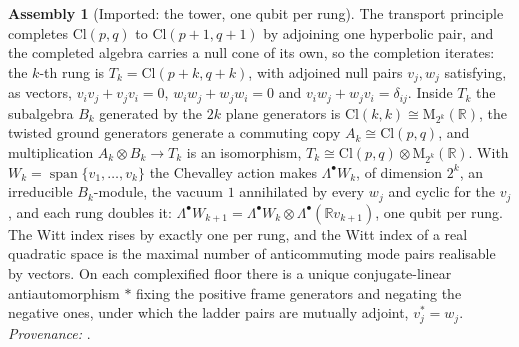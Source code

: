 \documentclass[11pt]{article}
\theoremstyle{definition}
\newtheorem{assembled}[theorem]{Assembly}
\theoremstyle{plain}
\providecommand{\Cl}{}\renewcommand{\Cl}{\mathrm{Cl}}
\providecommand{\R}{}\renewcommand{\R}{\mathbb{R}}
\begin{document}
\begin{assembled}[Imported: the tower, one qubit per rung]\label{c:rungs.imported-tower-one-qubit-per-rung}
The transport principle completes $\Cl(p,q)$ to $\Cl(p{+}1,q{+}1)$ by adjoining one hyperbolic pair, and the completed algebra carries a null cone of its own, so the completion iterates: the $k$-th rung is $T_{k} = \Cl(p{+}k, q{+}k)$, with adjoined null pairs $v_{j}, w_{j}$ satisfying, as vectors, $v_{i}v_{j} + v_{j}v_{i} = 0$, $w_{i}w_{j} + w_{j}w_{i} = 0$ and $v_{i}w_{j} + w_{j}v_{i} = \delta_{ij}$. Inside $T_{k}$ the subalgebra $B_{k}$ generated by the $2k$ plane generators is $\Cl(k,k) \cong \mathrm{M}_{2^{k}}(\R)$, the twisted ground generators generate a commuting copy $A_{k} \cong \Cl(p,q)$, and multiplication $A_{k} \otimes B_{k} \to T_{k}$ is an isomorphism, $T_{k} \cong \Cl(p,q) \otimes \mathrm{M}_{2^{k}}(\R)$. With $W_{k} = \operatorname{span}\{v_{1}, \ldots, v_{k}\}$ the Chevalley action makes $\Lambda^{\bullet}W_{k}$, of dimension $2^{k}$, an irreducible $B_{k}$-module, the vacuum $1$ annihilated by every $w_{j}$ and cyclic for the $v_{j}$, and each rung doubles it: $\Lambda^{\bullet}W_{k+1} = \Lambda^{\bullet}W_{k} \otimes \Lambda^{\bullet}(\R v_{k+1})$, one qubit per rung. The Witt index rises by exactly one per rung, and the Witt index of a real quadratic space is the maximal number of anticommuting mode pairs realisable by vectors. On each complexified floor there is a unique conjugate-linear antiautomorphism $*$ fixing the positive frame generators and negating the negative ones, under which the ladder pairs are mutually adjoint, $v_{j}^{*} = w_{j}$. \emph{Provenance:} \cite[Def.~2.2, Thm.~3.2, Prop.~4.1, Thms.~4.2, 4.3, Lem.~5.4]{ButlerT3}.
\end{assembled}
\end{document}
